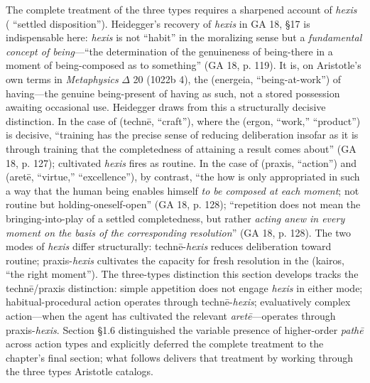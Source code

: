 The complete treatment of the three types requires a sharpened account of \textit{hexis} ( ``settled disposition''). Heidegger's recovery of \textit{hexis} in GA 18, §17 is indispensable here: \textit{hexis} is not ``habit'' in the moralizing sense but a \textit{fundamental concept of being}---``the determination of the genuineness of being-there in a moment of being-composed as to something'' (GA 18, p. 119). It is, on Aristotle's own terms in \textit{Metaphysics} $\Delta$ 20 (1022b 4), the  (energeia, ``being-at-work'') of having---the genuine being-present of having as such, not a stored possession awaiting occasional use. Heidegger draws from this a structurally decisive distinction. In the case of  (technē, ``craft''), where the  (ergon, ``work,'' ``product'') is decisive, ``training has the precise sense of reducing deliberation insofar as it is through training that the completedness of attaining a result comes about'' (GA 18, p. 127); cultivated \textit{hexis} fires as routine. In the case of  (praxis, ``action'') and  (aretē, ``virtue,'' ``excellence''), by contrast, ``the how is only appropriated in such a way that the human being enables himself \textit{to be composed at each moment}; not routine but holding-oneself-open'' (GA 18, p. 128); ``repetition does not mean the bringing-into-play of a settled completedness, but rather \textit{acting anew in every moment on the basis of the corresponding resolution}'' (GA 18, p. 128). The two modes of \textit{hexis} differ structurally: technē-\textit{hexis} reduces deliberation toward routine; praxis-\textit{hexis} cultivates the capacity for fresh resolution in the  (kairos, ``the right moment''). The three-types distinction this section develops tracks the technē/praxis distinction: simple appetition does not engage \textit{hexis} in either mode; habitual-procedural action operates through technē-\textit{hexis}; evaluatively complex action---when the agent has cultivated the relevant \textit{aretē}---operates through praxis-\textit{hexis}. Section \S 1.6 distinguished the variable presence of higher-order \textit{pathē} across action types and explicitly deferred the complete treatment to the chapter's final section; what follows delivers that treatment by working through the three types Aristotle catalogs.

